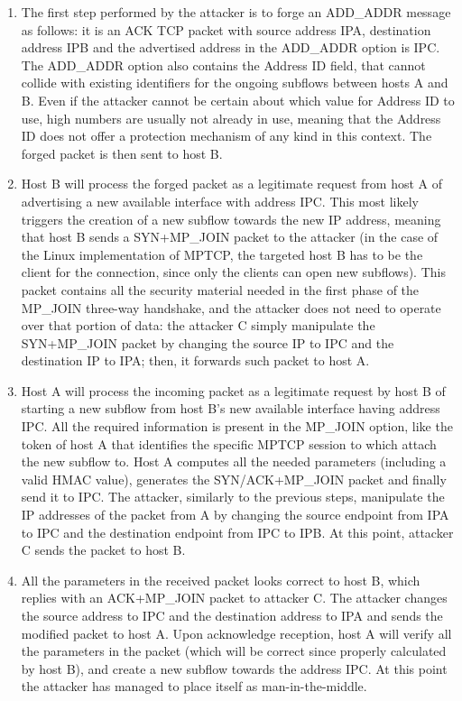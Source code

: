 \begin{enumerate}  
\item  The first step performed by the attacker is to forge an ADD\_ADDR message as follows: it is an ACK TCP packet with source address IPA, destination address IPB and the advertised address in the ADD\_ADDR option is IPC. The ADD\_ADDR option also contains the Address ID field, that cannot collide with existing identifiers for the ongoing subflows between hosts A and B. Even if the attacker cannot be certain about which value for Address ID to use, high numbers are usually not already in use, meaning that the Address ID does not offer a protection mechanism of any kind in this context.
The forged packet is then sent to host B.

\item Host B will process the forged packet as a legitimate request from host A of advertising a new available interface with address IPC. This most likely triggers the creation of a new subflow towards the new IP address, meaning that host B sends a SYN+MP\_JOIN packet to the attacker (in the case of the Linux implementation of MPTCP, the targeted host B has to be the client for the connection, since only the clients can open new subflows). This packet contains all the security material needed in the first phase of the MP\_JOIN three-way handshake, and the attacker does not need to operate over that portion of data: the attacker C simply manipulate the SYN+MP\_JOIN packet by changing the source IP to IPC and the destination IP to IPA; then, it forwards such packet to host A.

\item Host A will process the incoming packet as a legitimate request by host B of starting a new subflow from host B's new available interface having address IPC. All the required information is present in the MP\_JOIN option, like the token of host A that identifies the specific MPTCP session to which attach the new subflow to. Host A computes all the needed parameters (including a valid HMAC value), generates the SYN/ACK+MP\_JOIN packet and finally send it to IPC. The attacker, similarly to the previous steps, manipulate the IP addresses of the packet from A by changing the source endpoint from IPA to IPC and the destination endpoint from IPC to IPB. At this point, attacker C sends the packet to host B.

\item All the parameters in the received packet looks correct to host B, which replies with an ACK+MP\_JOIN packet to attacker C. The attacker changes the source address to IPC and the destination address to IPA and sends the modified packet to host A. Upon acknowledge reception, host A will verify all the parameters in the packet (which will be correct since properly calculated by host B), and create a new subflow towards the address IPC. At this point the attacker has managed to place itself as man-in-the-middle.


\end{enumerate}
